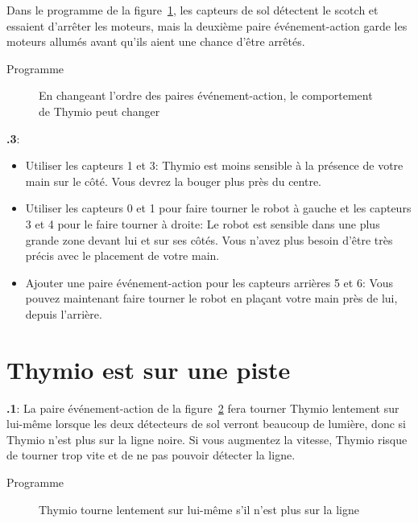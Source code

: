 \documentclass[12pt,a4paper,english]{article}
\begin{document}
Dans le programme de la figure~\ref{fig.change}, les capteurs de sol détectent le scotch et essaient d'arrêter les moteurs, mais la deuxième paire événement-action garde les moteurs allumés avant qu'ils aient une chance d'être arrêtés.

{\raggedleft \hfill Programme }

\begin{figure}[hbt]
\begin{center}
\caption{En changeant l'ordre des paires événement-action, le comportement de Thymio peut changer}\label{fig.change}
\end{center}
\end{figure}

\textbf{\thesection.3}: 
\begin{itemize}

\item Utiliser les capteurs 1 et 3: Thymio est moins sensible à la présence de votre main sur le côté. Vous devrez la bouger plus près du centre.

\item Utiliser les capteurs 0 et 1 pour faire tourner le robot à gauche et les capteurs 3 et 4 pour le faire tourner à droite: Le robot est sensible dans une plus grande zone devant lui et sur ses côtés. Vous n'avez plus besoin d'être très précis avec le placement de votre main.

\item Ajouter une paire événement-action pour les capteurs arrières 5 et 6: Vous pouvez maintenant faire tourner le robot en plaçant votre main près de lui, depuis l'arrière.

\end{itemize}


\section{Thymio est sur une piste}


\textbf{\thesection.1}: La paire événement-action de la figure~\ref{fig.turn_left_gentle} fera tourner Thymio lentement sur lui-même lorsque les deux détecteurs de sol verront beaucoup de lumière, donc si Thymio n'est plus sur la ligne noire. Si vous augmentez la vitesse, Thymio risque de tourner trop vite et de ne pas pouvoir détecter la ligne. 

{\raggedleft \hfill Programme }

\begin{figure}[hbt]
\begin{center}
\caption{Thymio tourne lentement sur lui-même s'il n'est plus sur la ligne}\label{fig.turn_left_gentle}
\end{center}
\end{figure}
\end{document}
